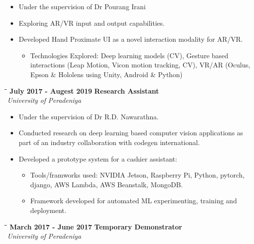 \documentclass[a4paper,11pt]{article}
\begin{document}
\vspace{-8pt}
\begin{itemize}
  \setlength\itemsep{0pt}
\item Under the supervision of Dr Pourang Irani
\item Exploring AR/VR input and output capabilities.
\item Developed Hand Proximate UI as a novel interaction modality for AR/VR.
  \vspace{-8pt}
  \begin{itemize}
  \item Technologies Explored: Deep learning models (CV), Gesture based interactions (Leap Motion, Vicon motion tracking, CV), VR/AR (Oculus, Epson \& Hololens using Unity, Android \& Python)
  \end{itemize}
\end{itemize}
\begin{tabbing}
  \=\hspace*{6cm}\=\hspace*{5cm}\= \kill
  \>\textbf{\large \textbar{}}\textbf{ July 2017 - Augest 2019} \> \textbf{Research Assistant}\\\>\> \emph{University of Peradeniya}
\end{tabbing}
\vspace{-8pt}
\begin{itemize}
  \setlength\itemsep{0pt}
\item Under the supervision of Dr R.D. Nawarathna.
\item Conducted research on deep learning based computer vision applications as part of an industry collaboration with codegen international.
\item Developed a prototype system for a cashier assistant:
  \vspace{-8pt}
  \begin{itemize}
    \setlength\itemsep{0pt}
  \item Tools/framworks used: NVIDIA Jetson, Raspberry Pi, Python, pytorch, django, AWS Lambda, AWS Beanstalk, MongoDB.
  \item Framework developed for automated ML experimenting, training and deployment.
  \end{itemize}
\end{itemize}
\begin{tabbing}
  \=\hspace*{6cm}\=\hspace*{5cm}\= \kill
  \>\textbf{\large \textbar{}}\textbf{ March 2017 - June 2017} \> \textbf{Temporary Demonstrator}\\\>\> \emph{University of Peradeniya}
\end{tabbing}
\end{document}
